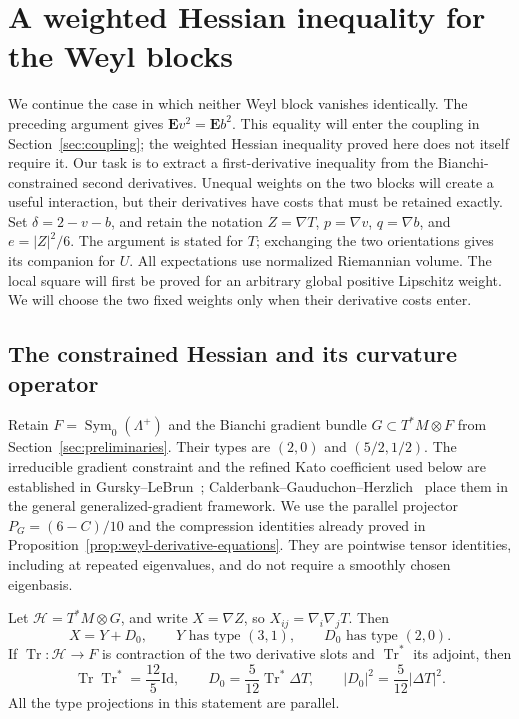 \section{A weighted Hessian inequality for the Weyl blocks}
\label{sec:hessian}

We continue the case in which neither Weyl block vanishes identically.
The preceding argument gives
\(\mathbf E v^2=\mathbf E b^2\). This equality will enter the coupling
in Section~\ref{sec:coupling}; the weighted Hessian inequality proved here
does not itself require it. Our task is to extract a first-derivative
inequality from the Bianchi-constrained second derivatives. Unequal
weights on the two blocks will create a useful interaction, but their
derivatives have costs that must be retained exactly.
Set \(\delta=2-v-b\), and retain the notation
\(Z=\nabla T\), \(p=\nabla v\), \(q=\nabla b\), and
\(e=|Z|^2/6\).
The argument is stated for $T$; exchanging the two orientations gives
its companion for $U$. All expectations use normalized Riemannian volume.
The local square will first be proved for an arbitrary global positive
Lipschitz weight. We will choose the two fixed weights only when their
derivative costs enter.

\subsection{The constrained Hessian and its curvature operator}

Retain $F=\operatorname{Sym}_0(\Lambda^+)$ and the Bianchi gradient
bundle $G\subset T^*M\otimes F$ from Section~\ref{sec:preliminaries}.
Their types are $(2,0)$ and $(5/2,1/2)$. The irreducible gradient
constraint and the refined Kato coefficient used below are established
in Gursky--LeBrun~\cite[Lemma~4, equations~(10)--(12)]{GurskyLeBrun1999};
Calderbank--Gauduchon--Herzlich~\cite{CalderbankGauduchonHerzlich2000}
place them in the general generalized-gradient framework. We use the
parallel projector $P_G=(6-C)/10$ and the compression identities already
proved in Proposition~\ref{prop:weyl-derivative-equations}. They are
pointwise tensor identities, including at repeated eigenvalues, and do
not require a smoothly chosen eigenbasis.

\begin{lemma}
\label{lem:hessian-components}
Let \(\mathcal H=T^*M\otimes G\), and write
\(X=\nabla Z\), so \(X_{ij}=\nabla_i\nabla_jT\).
Then
\[
 X=Y+D_0,
 \qquad
 Y\text{ has type }(3,1),\qquad
 D_0\text{ has type }(2,0).
\]
If \(\operatorname{Tr}:\mathcal H\to F\) is contraction of the
two derivative slots and \(\operatorname{Tr}^*\) its adjoint, then
\[
 \operatorname{Tr}\operatorname{Tr}^*=\frac{12}{5}\mathrm{Id},
 \qquad
 D_0=\frac5{12}\operatorname{Tr}^*\Delta T,
 \qquad
 |D_0|^2=\frac5{12}|\Delta T|^2.
\]
All the type projections in this statement are parallel.
\end{lemma}

